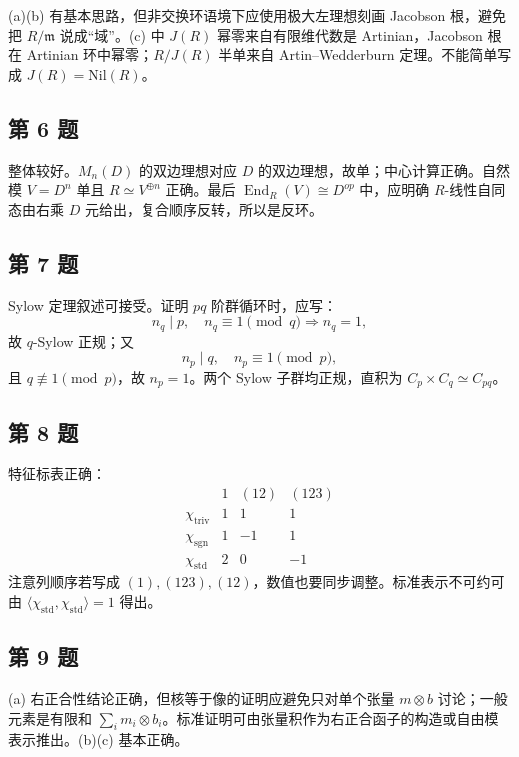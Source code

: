 \documentclass[11pt]{article}
\begin{document}
(a)(b) 有基本思路，但非交换环语境下应使用极大左理想刻画 Jacobson 根，避免把 \(R/\mathfrak m\) 说成“域”。(c) 中 \(J(R)\) 幂零来自有限维代数是 Artinian，Jacobson 根在 Artinian 环中幂零；\(R/J(R)\) 半单来自 Artin--Wedderburn 定理。不能简单写成 \(J(R)=\mathrm{Nil}(R)\)。

\subsection*{第 6 题}

整体较好。\(M_n(D)\) 的双边理想对应 \(D\) 的双边理想，故单；中心计算正确。自然模 \(V=D^n\) 单且 \(R\simeq V^{\oplus n}\) 正确。最后 \(\operatorname{End}_R(V)\cong D^{op}\) 中，应明确 \(R\)-线性自同态由右乘 \(D\) 元给出，复合顺序反转，所以是反环。

\subsection*{第 7 题}

Sylow 定理叙述可接受。证明 \(pq\) 阶群循环时，应写：
\[
  n_q\mid p,\quad n_q\equiv1\pmod q \Rightarrow n_q=1,
\]
故 \(q\)-Sylow 正规；又
\[
  n_p\mid q,\quad n_p\equiv1\pmod p,
\]
且 \(q\not\equiv1\pmod p\)，故 \(n_p=1\)。两个 Sylow 子群均正规，直积为 \(C_p\times C_q\simeq C_{pq}\)。

\subsection*{第 8 题}

特征标表正确：
\[
\begin{array}{c|ccc}
 & 1 & (12) & (123)\\
\hline
\chi_{\mathrm{triv}}&1&1&1\\
\chi_{\mathrm{sgn}}&1&-1&1\\
\chi_{\mathrm{std}}&2&0&-1
\end{array}
\]
注意列顺序若写成 \((1),(123),(12)\)，数值也要同步调整。标准表示不可约可由 \(\langle\chi_{\mathrm{std}},\chi_{\mathrm{std}}\rangle=1\) 得出。

\subsection*{第 9 题}

(a) 右正合性结论正确，但核等于像的证明应避免只对单个张量 \(m\otimes b\) 讨论；一般元素是有限和 \(\sum_i m_i\otimes b_i\)。标准证明可由张量积作为右正合函子的构造或自由模表示推出。(b)(c) 基本正确。
\end{document}
